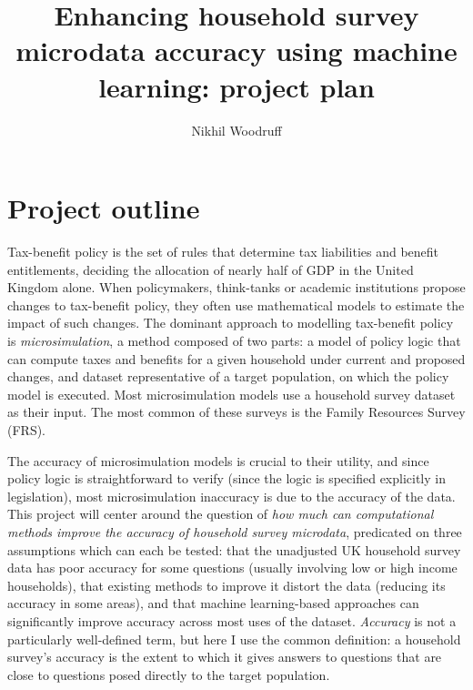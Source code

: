 \documentclass[twocolumn]{article}
\title{Enhancing household survey microdata accuracy using machine learning: project plan}
\date{}
\author{Nikhil Woodruff}
\begin{document}
\maketitle

\section{Project outline}

Tax-benefit policy is the set of rules that determine tax liabilities and benefit entitlements, deciding the allocation of nearly half of GDP in the United Kingdom alone. When policymakers, think-tanks or academic institutions propose changes to tax-benefit policy, they often use mathematical models to estimate the impact of such changes. The dominant approach to modelling tax-benefit policy is \emph{microsimulation}, a method composed of two parts: a model of policy logic that can compute taxes and benefits for a given household under current and proposed changes, and dataset representative of a target population, on which the policy model is executed. Most microsimulation models use a household survey dataset as their input. The most common of these surveys is the Family Resources Survey (FRS).

The accuracy of microsimulation models is crucial to their utility, and since policy logic is straightforward to verify (since the logic is specified explicitly in legislation), most microsimulation inaccuracy is due to the accuracy of the data. This project will center around the question of \emph{how much can computational methods improve the accuracy of household survey microdata}, predicated on three assumptions which can each be tested: that the unadjusted UK household survey data has poor accuracy for some questions (usually involving low or high income households), that existing methods to improve it distort the data (reducing its accuracy in some areas), and that machine learning-based approaches can significantly improve accuracy across most uses of the dataset. \emph{Accuracy} is not a particularly well-defined term, but here I use the common definition: a household survey's accuracy is the extent to which it gives answers to questions that are close to questions posed directly to the target population.
\end{document}
